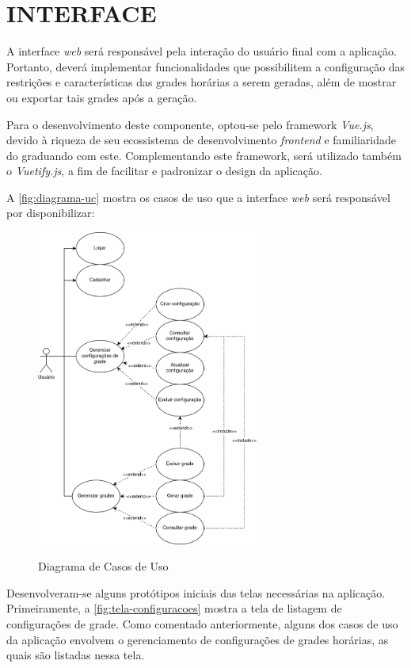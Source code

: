 \section{INTERFACE}

A interface \textit{web} será responsável pela interação do usuário final com a aplicação. Portanto, deverá implementar funcionalidades que possibilitem a configuração das restrições e características das grades horárias a serem geradas, além de mostrar ou exportar tais grades após a geração.

Para o desenvolvimento deste componente, optou-se pelo framework \textit{Vue.js}, devido à riqueza de seu ecossistema de desenvolvimento \textit{frontend} e familiaridade do graduando com este. Complementando este framework, será utilizado também o \textit{Vuetify.js}, a fim de facilitar e padronizar o design da aplicação.

A \autoref{fig:diagrama-uc} mostra os casos de uso que a interface \textit{web} será responsável por disponibilizar:

\begin{figure}[!htb]
	\centering
	\caption{Diagrama de Casos de Uso}
	\includegraphics[width=0.65\textwidth]{./dados/figuras/diagrama_uc}
	\label{fig:diagrama-uc}
\end{figure}
\newpage

Desenvolveram-se alguns protótipos iniciais das telas necessárias na aplicação.
Primeiramente, a \autoref{fig:tela-configuracoes} mostra a tela de listagem de configurações de grade. Como comentado anteriormente, alguns dos casos de uso da aplicação envolvem o gerenciamento de configurações de grades horárias, as quais são listadas nessa tela.

